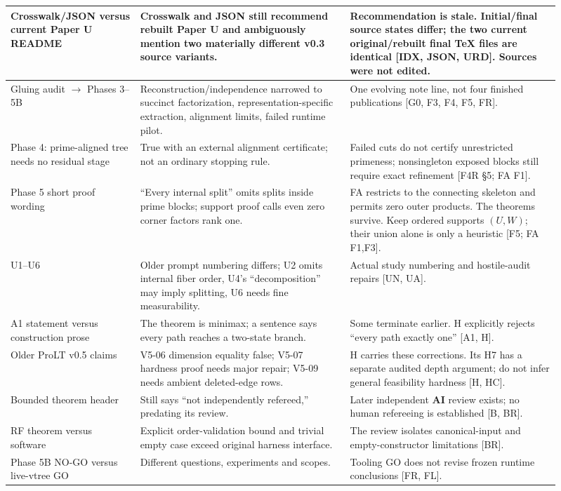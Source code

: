 \documentclass[10pt,letterpaper]{article}
\begin{document}
\begin{longtable}{@{}P{0.210\linewidth}P{0.348\linewidth}P{0.348\linewidth}@{}}
Crosswalk/JSON versus current Paper U README & Crosswalk and JSON still recommend rebuilt Paper U and ambiguously mention two materially different v0.3 source variants. & Recommendation is stale. Initial/final source states differ; the two current original/rebuilt final TeX files are identical [IDX, JSON, URD]. Sources were not edited. \\ \hline
Gluing audit \ensuremath{\to} Phases 3--5B & Reconstruction/independence narrowed to succinct factorization, representation-specific extraction, alignment limits, failed runtime pilot. & One evolving note line, not four finished publications [G0, F3, F4, F5, FR]. \\ \hline
Phase 4: prime-aligned tree needs no residual stage & True with an external alignment certificate; not an ordinary stopping rule. & Failed cuts do not certify unrestricted primeness; nonsingleton exposed blocks still require exact refinement [F4R \S{}5; FA F1]. \\ \hline
Phase 5 short proof wording & ``Every internal split'' omits splits inside prime blocks; support proof calls even zero corner factors rank one. & FA restricts to the connecting skeleton and permits zero outer products. The theorems survive. Keep ordered supports \((U,W)\); their union alone is only a heuristic [F5; FA F1,F3]. \\ \hline
U1--U6 & Older prompt numbering differs; U2 omits internal fiber order, U4's ``decomposition'' may imply splitting, U6 needs fine measurability. & Actual study numbering and hostile-audit repairs [UN, UA]. \\ \hline
A1 statement versus construction prose & The theorem is minimax; a sentence says every path reaches a two-state branch. & Some terminate earlier. H explicitly rejects ``every path exactly one'' [A1, H]. \\ \hline
Older ProLT v0.5 claims & V5-06 dimension equality false; V5-07 hardness proof needs major repair; V5-09 needs ambient deleted-edge rows. & H carries these corrections. Its H7 has a separate audited depth argument; do not infer general feasibility hardness [H, HC]. \\ \hline
Bounded theorem header & Still says ``not independently refereed,'' predating its review. & Later independent \textbf{AI} review exists; no human refereeing is established [B, BR]. \\ \hline
RF theorem versus software & Explicit order-validation bound and trivial empty case exceed original harness interface. & The review isolates canonical-input and empty-constructor limitations [BR]. \\ \hline
Phase 5B NO-GO versus live-vtree GO & Different questions, experiments and scopes. & Tooling GO does not revise frozen runtime conclusions [FR, FL]. \\ \hline
\end{longtable}
\endgroup
\end{document}

